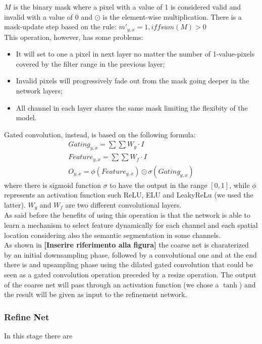 \documentclass[10pt,twocolumn,letterpaper]{article}
\begin{document}
	\(M\) is the binary mask where a pixel with a value of 1 is considered valid and invalid with a value of 0 and \(\odot\) is the element-wise multiplication.
	There is a mask-update step based on the rule: \(m'_{y,x} = 1, iff sum(M) > 0\)
	\\
	This operation, however, has some problems:
	\begin{itemize}
		\item 
		It will set to one a pixel in next layer no matter the number of 1-value-pixels covered by the filter range in the previous layer;
		\item
		Invalid pixels will progressively fade out from the mask going deeper in the network layers;
		\item
		All channel in each layer shares the same mask limiting the flexibity of the model.
	\end{itemize}
	Gated convolution, instead, is based on the following formula:
	\begin{gather}
		Gating_{y,x} = \sum \sum W_g \cdot I \\
		Feature_{y,x} = \sum \sum W_f \cdot I \\
		O_{y,x} = \phi (Feature_{y,x}) \odot \sigma (Gating_{y,x})
	\end{gather}
	where there is sigmoid function \(\sigma\) to have the output in the range \([0,1]\), while \(\phi\) represents an activation function such ReLU, ELU and LeakyReLu (we used the latter). \(W_g\) and \(W_f\) are two different convolutional layers.
	\\
	As said before the benefits of using this operation is that the network is able to learn a mechanism to select feature dynamically for each channel and each spatial location considering also the semantic segmentation in some channels.
	\\
	As shown in \textbf{[Inserire riferimento alla figura]} the coarse net is charaterized by an initial downsampling phase, followed by a convolutional one and at the end there is and upsampling phase using the dilated gated convolution that could be seen as a gated convolution operation preceded by a resize operation. The output of the coarse net will pass through an activation function (we chose a \(\tanh\)) and the result will be given as input to the refinement network.
	\subsubsection{Refine Net}
	In this stage there are
	
	{\small
		
		
	}
	
\end{document}
